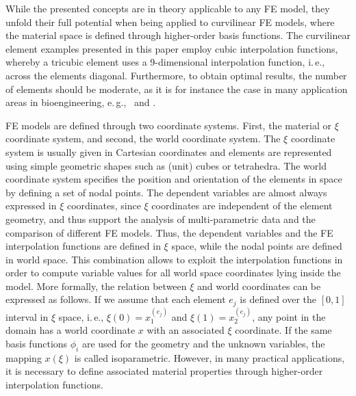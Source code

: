 \documentclass[review,journal]{vgtc}         %
\begin{document}
While the presented concepts are in theory applicable to any FE model, they unfold their full potential when being applied to curvilinear FE models, where the material space is defined through higher-order basis functions. The curvilinear element examples presented in this paper employ cubic interpolation functions, whereby a tricubic element uses a 9-dimensional interpolation function, i.\,e., across the elements diagonal. Furthermore, to obtain optimal results, the number of elements should be moderate, as it is for instance the case in many application areas in bioengineering, e.\,g.,~\cite{lee10deformation} and \cite{wuensche03deformation}.

FE models are defined through two coordinate systems. First, the material or $\xi$ coordinate system, and second, the world coordinate system. The $\xi$ coordinate system is usually given in Cartesian coordinates and elements are represented using simple geometric shapes such as (unit) cubes or tetrahedra. The world coordinate system specifies the position and orientation of the elements in space by defining a set of nodal points. The dependent variables are almost always expressed in $\xi$ coordinates, since $\xi$ coordinates are independent of the element geometry, and thus support the analysis of multi-parametric data and the comparison of different FE models. Thus, the dependent variables and the FE interpolation functions are defined in $\xi$ space, while the nodal points are defined in world space. This combination allows to exploit the interpolation functions in order to compute variable values for all world space coordinates lying inside the model. More formally, the relation between $\xi$ and world coordinates can be expressed as follows. If we assume that each element $e_j$ is defined over the $[0,1]$ interval in $\xi$ space, i.\,e., $\xi(0)=x^{(e_j)}_1$ and $\xi(1)=x^{(e_j)}_2$, any point in the domain has a world coordinate $x$ with an associated $\xi$ coordinate. If the same basis functions $\phi_i$ are used for the geometry and the unknown variables, the mapping $x(\xi)$ is called isoparametric. However, in many practical applications, it is necessary to define associated material properties through higher-order interpolation functions.
\end{document}
